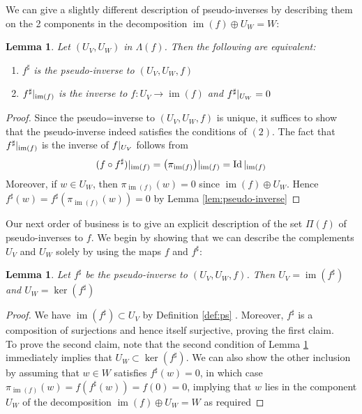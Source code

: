 \documentclass{book}
\theoremstyle{plain}
\newtheorem{lemma}[corollary]{Lemma}
\theoremstyle{definition}
\newcommand{\ds}{\oplus}
\DeclareMathOperator{\Id}{Id}
\DeclareMathOperator{\im}{im}
\newcommand{\mor}{\longrightarrow}
\begin{document}
We can give a slightly different description of pseudo-inverses by describing them on the 2 components in the decomposition $\im(f)\ds U_W =W$:


\begin{lemma}\label{lem:pschar2}
Let $(U_V,U_W)$ in $\Lambda(f)$. Then the following are equivalent:
\begin{enumerate}
	\item $f^\sharp$ is the pseudo-inverse to $(U_V,U_W,f)$
	\item $f^\sharp\arrowvert_{\im(f)}$ is the inverse to $f:U_V\mor \im(f)$ and $f^\sharp\arrowvert_{U_W}=0$
\end{enumerate}

\end{lemma}

\begin{proof}
	Since the pseudo=inverse to $(U_V,U_W,f)$ is unique, it suffices to show that the pseudo-inverse indeed satisfies the conditions of $(2)$. The fact that $f^\sharp\arrowvert_{\im(f)}$ is the inverse of $f\arrowvert_{U_V}$ follows from 
	\[
	(f\circ f^\sharp) \arrowvert_{\im(f)}=\big(\pi_{\im(f)}\big)\arrowvert_{\im(f)}=\Id\arrowvert_{\im(f)}
\] 
Moreover, if $w \in U_W$, then $\pi_{\im(f)}(w)=0$ since $\im(f)\ds U_W$. Hence $f^\sharp(w)=f^\sharp(\pi_{\im(f)}(w))=0$ by Lemma \ref{lem:pseudo-inverse}
\end{proof}
Our next order of business is to give an explicit description of the set $\Pi(f)$ of pseudo-inverses to $f$. We begin by showing that we can describe the complements $U_V$ and $U_W$ solely by using the maps $f$ and $f^\sharp$:
\begin{lemma}\label{lem:psim-ker}
	Let $f^\sharp$ be the pseudo-inverse to $(U_V,U_W,f)$. Then $U_V=\im(f^\sharp)$ and $U_W=\ker(f^\sharp)$
\end{lemma}

\begin{proof}
	We have $\im(f^\sharp)\subset U_V$ by Definition \ref{def:ps} . Moreover, $f^\sharp$ is a composition of surjections and hence itself surjective, proving the first claim.\\
	To prove the second claim, note that the second condition of Lemma \ref{lem:pschar2} immediately implies that $U_W\subset \ker(f^\sharp)$. We can also show the other inclusion by assuming that $w\in W$ satisfies $f^\sharp(w)=0$, in which case $\pi_{\im(f)}(w)=f(f^\sharp(w))=f(0)=0$, implying that $w$ lies in the component $U_W$ of the decomposition $\im(f)\ds U_W=W$ as required
\end{proof}
\end{document}
